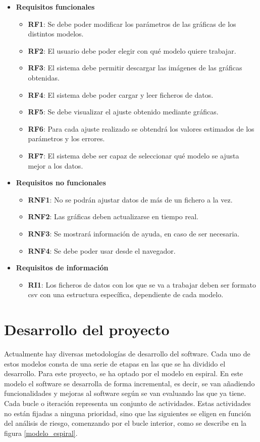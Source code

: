 \begin{itemize}
\item \textbf{Requisitos funcionales}
	\begin{itemize}
	\item \textbf{RF1}: Se debe poder modificar los parámetros de las gráficas de los distintos modelos.
	\item \textbf{RF2}: El usuario debe poder elegir con qué modelo quiere trabajar.
	\item \textbf{RF3}: El sistema debe permitir descargar las imágenes de las gráficas obtenidas.
	\item \textbf{RF4}: El sistema debe poder cargar y leer ficheros de datos.
	\item \textbf{RF5}: Se debe visualizar el ajuste obtenido mediante gráficas.
	\item \textbf{RF6}: Para cada ajuste realizado se obtendrá los valores estimados de los parámetros y los errores.
	\item \textbf{RF7}: El sistema debe ser capaz de seleccionar qué modelo se ajusta mejor a los datos. 
	\end{itemize}
\item \textbf{Requisitos no funcionales}
	\begin{itemize}
	\item \textbf{RNF1}: No se podrán ajustar datos de más de un fichero a la vez.
	\item \textbf{RNF2}: Las gráficas deben actualizarse en tiempo real.
	\item \textbf{RNF3}: Se mostrará información de ayuda, en caso de ser necesaria.
	\item \textbf{RNF4}: Se debe poder usar desde el navegador.
	\end{itemize}
\item \textbf{Requisitos de información}
	\begin{itemize}
	\item \textbf{RI1}: Los ficheros de datos con los que se va a trabajar deben ser formato csv con una estructura específica, dependiente de cada modelo.
	\end{itemize}
\end{itemize}

\section{Desarrollo del proyecto}

Actualmente hay diversas metodologías de desarrollo del software. Cada uno de estos modelos consta de una serie de etapas en las que se ha dividido el desarrollo. Para este proyecto, se ha optado por el modelo en espiral. En este modelo el software se desarrolla de forma incremental, es decir, se van añadiendo funcionalidades y mejoras al software según se van evaluando las que ya tiene. Cada bucle o iteración representa un conjunto de actividades. Estas actividades no están fijadas a ninguna prioridad, sino que las siguientes se eligen en función del análisis de riesgo, comenzando por el bucle interior, como se describe en la figura \eqref{modelo_espiral}.

